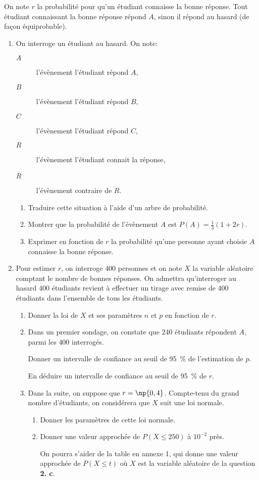 \documentclass[10pt]{article}
\begin{document}
On note $r$ la probabilité pour qu'un étudiant connaisse la bonne réponse. Tout étudiant connaissant la bonne réponse répond $A$, sinon il répond au hasard (de façon équiprobable).

\begin{enumerate}
\item On interroge un étudiant au hasard. On note:
	\begin{description}
		\item[$A$] l'évènement \og l'étudiant répond $A$\fg{},
		\item[$B$] l'évènement \og l'étudiant répond $B$\fg{},
		\item[$C$] l'évènement \og l'étudiant répond $C$\fg{},
		\item[$R$] l'évènement \og l'étudiant connait la réponse\fg{},
		\item[$\overline{R}$] l'évènement contraire de $R$.
	\end{description}
	\begin{enumerate}
		\item Traduire cette situation à l'aide d'un arbre de probabilité.
		\item Montrer que la probabilité de l'évènement $A$ est $P(A)=\frac13\left(1+2r\right)$.
		\item Exprimer en fonction de $r$ la probabilité qu'une personne ayant choisie $A$ connaisse la bonne réponse.
	\end{enumerate}
\item Pour estimer $r$, on interroge $400$ personnes et on note $X$ la variable aléatoire comptant le nombre de bonnes réponses. On admettra qu'interroger au hasard $400$ étudiants revient à effectuer un tirage avec remise de $400$ étudiants dans l'ensemble de tous les étudiants.
	\begin{enumerate}
		\item Donner la loi de $X$ et ses paramètres $n$ et $p$ en fonction de $r$.
		\item Dans un premier sondage, on constate que $240$ étudiants répondent $A$, parmi les $400$ interrogés.

Donner un intervalle de confiance au seuil de 95~\% de l'estimation de $p$.

En déduire un intervalle de confiance au seuil de 95~\% de $r$.
		\item Dans la suite, on suppose que $r = \np{0,4}$. Compte-tenu du grand nombre d'étudiants, on considérera que $X$ suit une loi normale.
			\begin{enumerate}
				\item Donner les paramètres de cette loi normale.
				\item Donner une valeur approchée de $P(X\leqslant 250)$ à $10^{-2}$ près.
				
On pourra s'aider de la table en annexe 1, qui donne une valeur approchée de $P(X\leqslant t)$ où $X$ est la variable aléatoire de la question \textbf{2. c}.
			\end{enumerate}
	\end{enumerate}
\end{enumerate}
\end{document}
